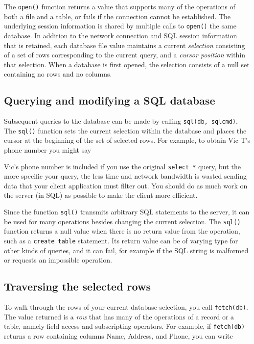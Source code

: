 
The \texttt{open()} function returns a value that supports many of the
operations of both a file and a table, or fails if the connection
cannot be established. The underlying session information is shared by
multiple calls to \texttt{open()} the same database. In addition to
the network connection and SQL session information that is retained,
each database file value maintains a current \textit{selection}
consisting of a set of rows corresponding to the current query, and a
\textit{cursor position} within that selection. When a database is
first opened, the selection consists of a null set containing no rows
and no columns.

\subsection{Querying and modifying a SQL database}

Subsequent queries to the database can be made by calling
\texttt{sql(db, sqlcmd)}. The \texttt{sql()} function sets
the current selection within the database and places the cursor at the
beginning of the set of selected rows. For example, to obtain Vic
T's phone number you might say


Vic's phone number is included if you use the original
\texttt{select *} query, but the more specific your query, the less
time and network bandwidth is wasted sending data that your client
application must filter out. You should do as much work on the server
(in SQL) as possible to make the client more efficient.

Since the function \texttt{sql()} transmits arbitrary SQL statements to
the server, it can be used for many operations besides changing the
current selection. The \texttt{sql()} function returns a null value
when there is no return value from the operation, such as a
\texttt{create table} statement. Its return value can be of varying
type for other kinds of queries, and it can fail, for example if the
SQL string is malformed or requests an impossible operation.

\subsection{Traversing the selected rows}

To walk through the rows of your current database selection, you call
\texttt{fetch(db)}. The value returned is a
\textit{row} that has many of the operations of a record or a table,
namely field access and subscripting operators. For example, if
\texttt{fetch(db)} returns a row containing columns Name, Address, and
Phone, you can write

